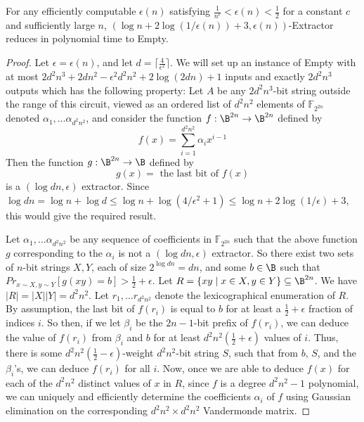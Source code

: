 \begin{theorem}\label{thm:ext}
For any efficiently computable $\epsilon(n)$ satisfying $\frac{1}{n^c} < \epsilon(n) < \frac{1}{2}$ for a constant $c$ and sufficiently large $n$, {\sc $(\log n + 2\log(1/\epsilon(n)) + 3, \epsilon(n))$-Extractor} reduces in polynomial time to {\sc Empty}.
\end{theorem}
\begin{proof}
Let $\epsilon = \epsilon(n)$, and let $d = \lceil \frac{4}{\epsilon^2} \rceil$.
We will set up an instance of {\sc Empty} with at most $2d^2n^3 + 2dn^2 - \epsilon^2d^2n^2 + 2\log(2dn) + 1$ inputs and exactly $2d^2n^3$ outputs which has the following property: Let $A$ be any $2d^2n^3$-bit string outside the range of this circuit, viewed as an ordered list of $d^2n^2$ elements of $\mathbb{F}_{2^{2n}}$ denoted $\alpha_1, \ldots \alpha_{d^2n^2}$, and consider the function $f: \B^{2n} \rightarrow \B^{2n}$ defined by
\[
f(x) = \sum\limits_{i=1}^{d^2n^2}\alpha_i x^{i-1}
\]
Then the function $g: \B^{2n} \rightarrow \B$ defined by
\[
g(x) = \text{ the last bit of } f(x)
\]
is a $(\log dn, \epsilon)$ extractor. Since $\log dn = \log n + \log d \leq \log n + \log(4/\epsilon^2 + 1) \leq \log n + 2\log(1/\epsilon) + 3$, this would give the required result.

Let $\alpha_1, \ldots \alpha_{d^2n^2}$ be any sequence of coefficients in $\mathbb{F}_{2^{2n}}$ such that the above function $g$ corresponding to the $\alpha_i$ is not a $(\log dn, \epsilon)$ extractor. So there exist two sets of $n$-bit strings $X,Y$, each of size $2^{\log dn} = dn$, and some $b \in \B$ such that $Pr_{x \sim X, y \sim Y}[g(xy) = b] > \frac{1}{2} + \epsilon$. Let $R = \{xy \mid x \in X, y \in Y\} \subseteq \B^{2n}$. We have $|R| = |X||Y| = d^2n^2$. Let $r_1, \ldots r_{d^2n^2}$ denote the lexicographical enumeration of $R$. By assumption, the last bit of $f(r_i)$ is equal to $b$ for at least a $\frac{1}{2} + \epsilon$ fraction of indices $i$. So then, if we let $\beta_i$ be the $2n-1$-bit prefix of $f(r_i)$, we can deduce the value of $f(r_i)$ from $\beta_i$ and $b$ for at least $d^2n^2(\frac{1}{2} + \epsilon)$ values of $i$. Thus, there is some $d^2n^2(\frac{1}{2} - \epsilon)$-weight $d^2n^2$-bit string $S$, such that from $b$, $S$, and the $\beta_i$'s, we can deduce $f(r_i)$ for all $i$. Now, once we are able to deduce $f(x)$ for each of the $d^2n^2$ distinct values of $x$ in $R$, since $f$ is a degree $d^2n^2-1$ polynomial, we can uniquely and efficiently determine the coefficients $\alpha_i$ of $f$ using Gaussian elimination on the corresponding $d^2n^2 \times d^2n^2$ Vandermonde matrix.


\end{proof}
